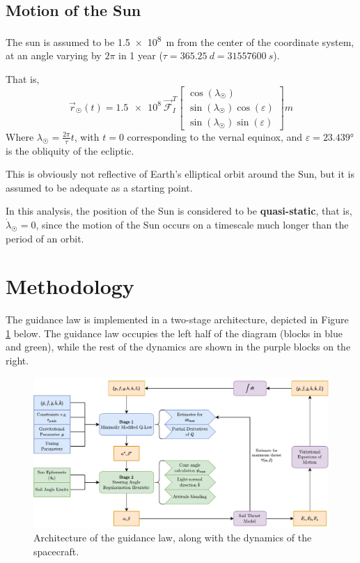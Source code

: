 \subsection{Motion of the Sun}
The sun is assumed to be \qty{1.5e8}{m} from the center of the coordinate system, at an angle varying by $2\pi$ in 1 year ($\tau = \qty{365.25}{d} = \qty{31557600}{s}$).

That is,
\begin{equation}
  \vec{r}_{\astrosun}(t) =
  \num{1.5e8}
  \
  \mathcal{\vec{F}}_I^T
  \begin{bmatrix}
    \cos(\lambda_{\astrosun})                   \\
    \sin(\lambda_{\astrosun}) \cos(\varepsilon) \\
    \sin(\lambda_{\astrosun}) \sin(\varepsilon)
  \end{bmatrix}
  \unit{m}
  \label{eq:sun_position_3d}
\end{equation}
Where $\lambda_{\astrosun} = \frac{2 \pi}{\tau} t$, with $t=0$ corresponding to the vernal equinox, and $\varepsilon = \ang{23.439}$ is the obliquity of the ecliptic.

This is obviously not reflective of Earth's elliptical orbit around the Sun, but it is assumed to be adequate as a starting point.

In this analysis, the position of the Sun is considered to be \textbf{quasi-static}, that is, $\dot{\lambda}_{\astrosun} = 0$, since the motion of the Sun occurs on a timescale much longer than the period of an orbit.

\section{Methodology}
The guidance law is implemented in a
two-stage architecture, depicted in Figure \ref{fig:algorithm_diagram} below. The guidance law occupies the left half of the diagram (blocks in blue and green), while the rest of the dynamics are shown in the purple blocks on the right.

\begin{figure}[H]
  \centering
  \includegraphics[width=\textwidth]{figures/compute_topology.drawio.pdf}
  \caption{Architecture of the guidance law, along with the dynamics of the spacecraft.}
  \label{fig:algorithm_diagram}
\end{figure}

